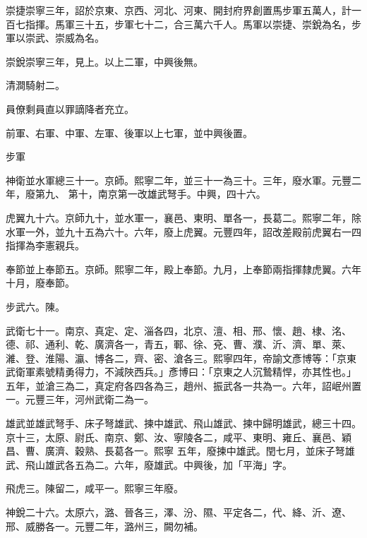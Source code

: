 \begin{pinyinscope}
 崇捷崇寧三年，詔於京東、京西、河北、河東、開封府界創置馬步軍五萬人，計一百七指揮。馬軍三十五，步軍七十二，合三萬六千人。馬軍以崇捷、崇銳為名，步軍以崇武、崇威為名。



 崇銳崇寧三年，見上。以上二軍，中興後無。



 清澗騎射二。



 員僚剩員直以罪謫降者充立。



 前軍、右軍、中軍、左軍、後軍以上七軍，並中興後置。



 步軍



 神衛並水軍總三十一。京師。熙寧二年，並三十一為三十。三年，廢水軍。元豐二年，廢第九、
 第十，南京第一改雄武弩手。中興，四十六。



 虎翼九十六。京師九十，並水軍一，襄邑、東明、單各一，長葛二。熙寧二年，除水軍一外，並九十五為六十。六年，廢上虎翼。元豐四年，詔改差殿前虎翼右一四指揮為李憲親兵。



 奉節並上奉節五。京師。熙寧二年，殿上奉節。九月，上奉節兩指揮隸虎翼。六年十月，廢奉節。



 步武六。陳。



 武衛七十一。南京、真定、定、淄各四，北京、澶、相、邢、懷、趙、棣、洺、德、祁、通利、乾、廣濟各一，青五，鄆、徐、兗、曹、濮、沂、濟、單、萊、濰、登、淮陽、瀛、博各二，齊、密、滄各三。熙寧四年，帝諭文彥博等：「京東武衛軍素號精勇得力，不減陜西兵。」彥博曰：「京東之人沉鷙精悍，亦其性也。」五年，並滄三為二，真定府各四各為三，趙州、振武各一共為一。六年，詔岷州置一。元豐三年，河州武衛二為一。



 雄武並雄武弩手、床子弩雄武、揀中雄武、飛山雄武、揀中歸明雄武，總三十四。京十三，太原、尉氏、南京、鄭、汝、寧陵各二，咸平、東明、雍丘、襄邑、穎昌、曹、廣濟、穀熟、長葛各一。熙寧
 五年，廢揀中雄武。閏七月，並床子弩雄武、飛山雄武各五為二。六年，廢雄武。中興後，加「平海」字。



 飛虎三。陳留二，咸平一。熙寧三年廢。



 神銳二十六。太原六，潞、晉各三，澤、汾、隰、平定各二，代、絳、沂、遼、邢、威勝各一。元豐二年，潞州三，闕勿補。




\end{pinyinscope}
